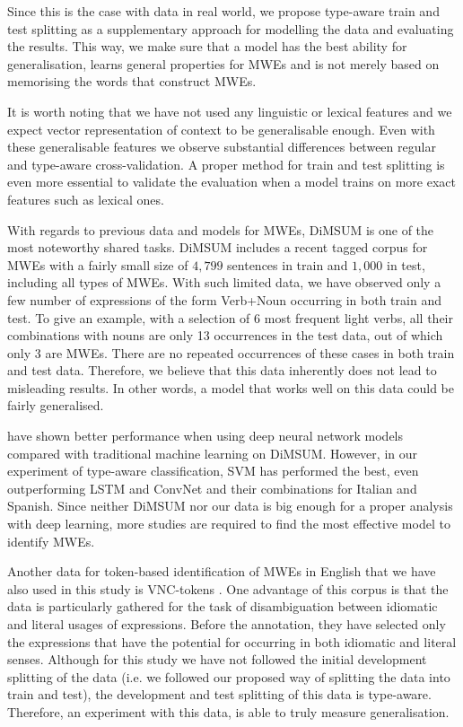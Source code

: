 \documentclass[output=paper
,modfonts
,nonflat]{langsci/langscibook}
\begin{document}
Since this is the case with data in real world, we propose type-aware train and test splitting as a supplementary approach for modelling the data and evaluating the results. This way, we make sure that a model has the best ability for generalisation, learns general properties for MWEs and is not merely based on memorising the words that construct MWEs.%

It is worth noting that we have not used any linguistic or lexical features and we expect vector representation of context to be generalisable enough. Even with these generalisable features we observe substantial differences between regular and type-aware cross-validation.
A proper method for train and test splitting is even more essential to validate the evaluation when a model trains on more exact features such as lexical ones.

With regards to previous data and models for MWEs, DiMSUM is one of the most noteworthy shared tasks.
DiMSUM includes a recent tagged corpus for MWEs with a fairly small size of $4,799$ sentences in train and $1,000$ in test, including all types of MWEs. With such limited data, we have observed only a few number of expressions of the form Verb+Noun occurring in both train and test. To give an example, with a selection of 6 most frequent light verbs, all their combinations with nouns are only 13 occurrences in the test data, out of which only 3 are MWEs. There are no repeated occurrences of these cases in both train and test data. Therefore, we believe that this data inherently does not lead to misleading results. In other words, a model that works well on this data could be fairly generalised.

\cite{Gharbieh2017} have shown better performance when using deep neural network models compared with traditional machine learning on DiMSUM. However, in our experiment of type-aware classification, SVM has performed the best, even outperforming LSTM and ConvNet and their combinations for Italian and Spanish.
Since neither DiMSUM nor our data is big enough for a proper analysis with deep learning, more studies are required to find the most effective model to identify MWEs.

Another data for token-based identification of MWEs in English that we have also used in this study is VNC-tokens \citep{cook2008vnc}. One advantage of this corpus is that the data is particularly gathered for the task of disambiguation between idiomatic and literal usages of expressions. Before the annotation, they have selected only the expressions that have the potential for occurring in both idiomatic and literal senses. 
Although for this study we have not followed the initial development splitting of the data (i.e. we followed our proposed way of splitting the data into train and test),
the development and test splitting of this data is type-aware. Therefore, an experiment with this data, is able to truly measure generalisation. %
\end{document}
